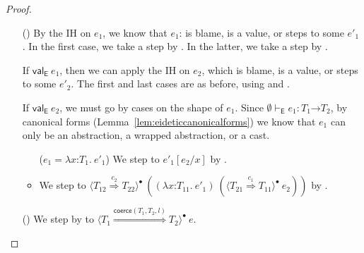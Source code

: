 \documentclass[9pt]{extarticle}
\newcommand{\ottnt}[1]{\mathit{#1}}
\newcommand{\ottsym}[1]{#1}
\begin{document}
\begin{lemma}
\begin{proof}
{\begin{itemize}
    \item[(\T{App})] By the IH on $\ottnt{e_{{\mathrm{1}}}}$, we know that $\ottnt{e_{{\mathrm{1}}}}$: is
      blame, is a value, or steps to some $\ottnt{e'_{{\mathrm{1}}}}$. In the first
      case, we take a step by . In the latter, we take a
      step by .

      If $ \mathsf{val} _{  \mathsf{E}  }~ \ottnt{e_{{\mathrm{1}}}} $, then we can apply the IH on $\ottnt{e_{{\mathrm{2}}}}$, which
      is blame, is a value, or steps to some $\ottnt{e'_{{\mathrm{2}}}}$. The first and
      last cases are as before, using  and .

      If $ \mathsf{val} _{  \mathsf{E}  }~ \ottnt{e_{{\mathrm{2}}}} $, we must go by cases on the shape of
      $\ottnt{e_{{\mathrm{1}}}}$. Since $ \emptyset   \vdash _{  \mathsf{E}  }  \ottnt{e_{{\mathrm{1}}}}  :   \ottnt{T_{{\mathrm{1}}}} \mathord{ \rightarrow } \ottnt{T_{{\mathrm{2}}}}  $, by canonical forms
      (Lemma~\ref{lem:eideticcanonicalforms}) we know that $\ottnt{e_{{\mathrm{1}}}}$ can only
      be an abstraction, a wrapped abstraction, or a cast.
\begin{itemize}
      \item[($\ottnt{e_{{\mathrm{1}}}}  \ottsym{=}   \lambda \mathit{x} \mathord{:} \ottnt{T_{{\mathrm{1}}}} .~  \ottnt{e'_{{\mathrm{1}}}} $)] We step to $ \ottnt{e'_{{\mathrm{1}}}}  [  \ottnt{e_{{\mathrm{2}}}} / \mathit{x}  ] $ by
        .

      \item[($\ottnt{e_{{\mathrm{1}}}}  \ottsym{=}   \langle   \ottnt{T_{{\mathrm{11}}}} \mathord{ \rightarrow } \ottnt{T_{{\mathrm{12}}}}   \mathord{ \overset{ \ottnt{c_{{\mathrm{1}}}}  \mapsto  \ottnt{c_{{\mathrm{2}}}} }{\Rightarrow} }   \ottnt{T_{{\mathrm{21}}}} \mathord{ \rightarrow } \ottnt{T_{{\mathrm{22}}}}   \rangle^{\bullet} ~   \lambda \mathit{x} \mathord{:} \ottnt{T_{{\mathrm{11}}}} .~  \ottnt{e'_{{\mathrm{1}}}}  $)] We
        step to $ \langle  \ottnt{T_{{\mathrm{12}}}}  \mathord{ \overset{ \ottnt{c_{{\mathrm{2}}}} }{\Rightarrow} }  \ottnt{T_{{\mathrm{22}}}}  \rangle^{\bullet} ~   (   (  \lambda \mathit{x} \mathord{:} \ottnt{T_{{\mathrm{11}}}} .~  \ottnt{e'_{{\mathrm{1}}}}  )  ~  (  \langle  \ottnt{T_{{\mathrm{21}}}}  \mathord{ \overset{ \ottnt{c_{{\mathrm{1}}}} }{\Rightarrow} }  \ottnt{T_{{\mathrm{11}}}}  \rangle^{\bullet} ~  \ottnt{e_{{\mathrm{2}}}}  )   )  $ by .
      \end{itemize}

    \item[(\T{Cast})] We step by  to $ \langle  \ottnt{T_{{\mathrm{1}}}}  \mathord{ \overset{  \mathsf{coerce} ( \ottnt{T_{{\mathrm{1}}}} , \ottnt{T_{{\mathrm{2}}}} , \ottnt{l} )  }{\Rightarrow} }  \ottnt{T_{{\mathrm{2}}}}  \rangle^{\bullet} ~  \ottnt{e} $.


\end{itemize}}
\end{proof}
\end{lemma}
\end{document}
